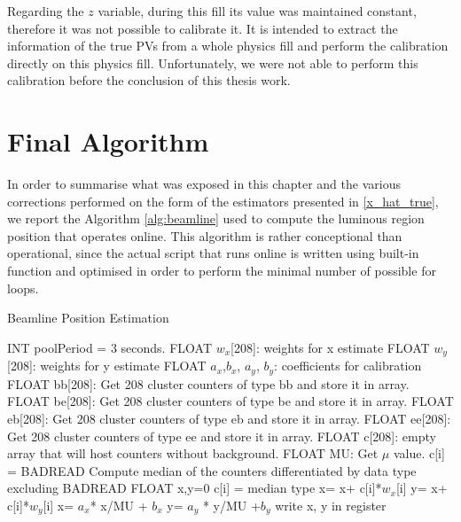 Regarding the $z$ variable, during this fill its value was maintained constant, therefore it was not possible to calibrate it. It is intended to extract the information of the true PVs from a whole physics fill and perform the calibration directly on this physics fill. Unfortunately, we were not able to perform this calibration before the conclusion of this thesis work. 


\section{Final Algorithm}
In order to summarise what was exposed in this chapter and the various corrections performed on the form of the estimators presented in \eqref{x_hat_true}, we report the Algorithm \ref{alg:beamline} used to compute the luminous region position that operates online. This algorithm is rather conceptional than operational, since the actual script that runs online is written using built-in function and optimised in order to perform the minimal number of possible for loops. %
\begin{algorithm}[H]
\caption{Beamline Position Estimation}\label{alg:beamline}
\begin{algorithmic}[1]
\ENSURE  INT poolPeriod = 3 seconds.
\ENSURE  FLOAT $w_x$[208]: weights for x estimate
\ENSURE  FLOAT $w_y$[208]: weights for y estimate
\ENSURE  FLOAT $a_x$,$ b_x$, $a_y$, $b_y$: coefficients for calibration 
        \STATE FLOAT  bb[208]: Get 208 cluster counters of type bb and store it in array.
        \STATE FLOAT  be[208]: Get 208 cluster counters of type be and store it in array.
        \STATE FLOAT  eb[208]: Get 208 cluster counters of type eb and store it in array.
        \STATE FLOAT  ee[208]: Get 208 cluster counters of type ee and store it in array.
        \STATE FLOAT c[208]: empty array that will host counters without background.
        \STATE FLOAT MU: Get $\mu$ value.
        \ELSE
        \STATE c[i] = BADREAD
        \ENDIF
        \ENDFOR
        \STATE Compute median of the counters differentiated by data type excluding BADREAD 
        \STATE FLOAT x,y=0
            \STATE c[i] = median type 
        \ENDIF
        \STATE x= x+ c[i]*$w_x$[i]
        \STATE y= x+ c[i]*$w_y$[i]
        \ENDFOR
        \STATE x= $a_x$* x/MU + $b_x$
        \STATE y= $a_y$ * y/MU +$b_y$
        \STATE write x, y in register
        \ENDIF
    \ENDIF
\ENDWHILE
\end{algorithmic}
\end{algorithm}

